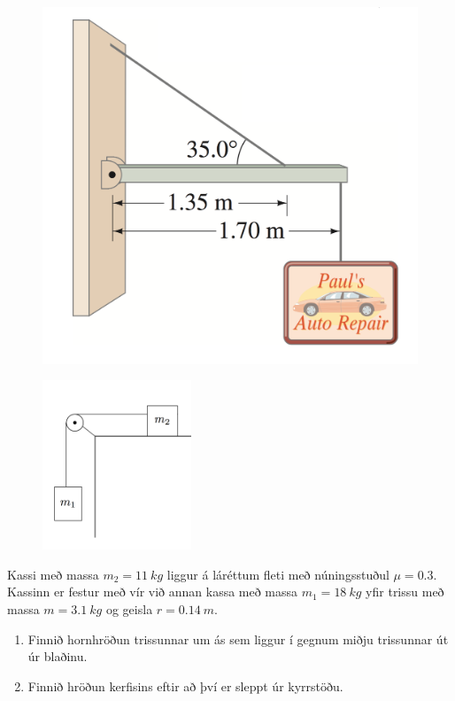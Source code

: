 \begin{enumerate}[label = \textbf{Dæmi \thechapter.\arabic*.}]
\begin{figure}[H]
    \centering
    \includegraphics[scale = 0.3]{images/anna.png}
\end{figure}


\begin{minipage}{\linewidth}

\begin{figure}
\vspace{-1.4cm}
\includegraphics[width=1.75in]{images/trissa.png}
\end{figure}
\item Kassi með massa $m_2 = \SI{11}{kg}$ liggur á láréttum fleti með núningsstuðul $\mu = 0.3$. Kassinn er festur með vír við annan kassa með massa $m_1 = \SI{18}{kg}$ yfir trissu með massa $m = \SI{3.1}{kg}$ og geisla $r = \SI{0.14}{m}$.
\begin{enumerate}
    \item Finnið hornhröðun trissunnar um ás sem liggur í gegnum miðju trissunnar út úr blaðinu.
    \item Finnið hröðun kerfisins eftir að því er sleppt úr kyrrstöðu.
\end{enumerate}
\end{minipage}


\end{enumerate}
